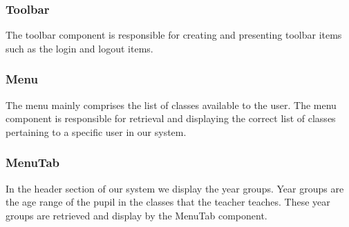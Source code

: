 \subsubsection{Toolbar}
The toolbar component is responsible for creating and presenting toolbar items such as the login and logout items.

\subsubsection{Menu}
The menu mainly comprises the list of classes available to the user. The menu component is responsible for retrieval and displaying the correct list of classes pertaining to a specific user in our system.

\subsubsection{MenuTab}
In the header section of our system we display the year groups. Year groups are the age range of the pupil in the classes that the teacher teaches. These year groups are retrieved and display by the MenuTab component.